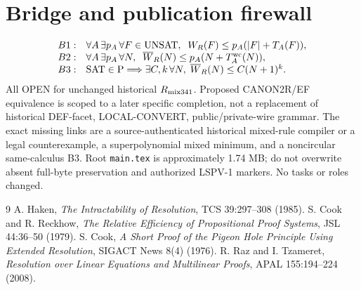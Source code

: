 \documentclass[11pt]{article}
\begin{document}
\section*{Bridge and publication firewall}
\[
\begin{array}{ll}
B1:&\forall A\,\exists p_A\,\forall F\in\mathrm{UNSAT},\;\;W_R(F)\le p_A(|F|+T_A(F)),\\
B2:&\forall A\,\exists p_A\,\forall N,\;\;\overline W_R(N)\le p_A(N+T_A^{\rm wc}(N)),\\
B3:&\mathrm{SAT}\in\mathrm P\Longrightarrow\exists C,k\,\forall N,\;\overline W_R(N)\le C(N+1)^k.
\end{array}
\]
All OPEN for unchanged historical $R_{\rm mix341}$. Proposed CANON2R/EF equivalence is scoped to a later specific completion, not a replacement of historical DEF-facet, LOCAL-CONVERT, public/private-wire grammar. The exact missing links are a source-authenticated historical mixed-rule compiler or a legal counterexample, a superpolynomial mixed minimum, and a noncircular same-calculus B3. Root \texttt{main.tex} is approximately 1.74 MB; do not overwrite absent full-byte preservation and authorized LSPV-1 markers. No tasks or roles changed.

\begin{thebibliography}{9}
 A. Haken, \emph{The Intractability of Resolution}, TCS 39:297--308 (1985).
 S. Cook and R. Reckhow, \emph{The Relative Efficiency of Propositional Proof Systems}, JSL 44:36--50 (1979).
 S. Cook, \emph{A Short Proof of the Pigeon Hole Principle Using Extended Resolution}, SIGACT News 8(4) (1976).
 R. Raz and I. Tzameret, \emph{Resolution over Linear Equations and Multilinear Proofs}, APAL 155:194--224 (2008).
\end{thebibliography}
\end{document}
